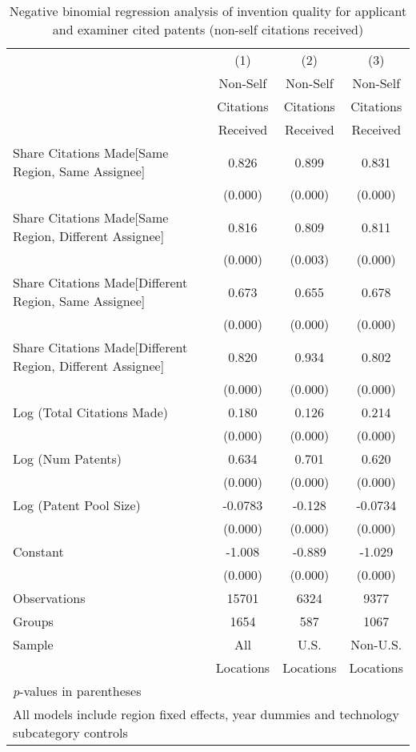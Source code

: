 {
\begin{longtable}{l*{3}{c}}
\caption{Negative binomial regression analysis of invention quality for applicant and examiner cited patents (non-self citations received) \label{ae.model192021}}\\
\hline\hline\endfirsthead\hline\endhead\hline\endfoot\endlastfoot
                &\multicolumn{1}{c}{(1)}&\multicolumn{1}{c}{(2)}&\multicolumn{1}{c}{(3)}\\
                &\multicolumn{1}{c}{Non-Self}&\multicolumn{1}{c}{Non-Self}&\multicolumn{1}{c}{Non-Self}\\
                &\multicolumn{1}{c}{Citations}&\multicolumn{1}{c}{Citations}&\multicolumn{1}{c}{Citations}\\
                &\multicolumn{1}{c}{Received}&\multicolumn{1}{c}{Received}&\multicolumn{1}{c}{Received}\\
\hline
Share Citations Made[Same Region, Same Assignee]&    0.826&    0.899&    0.831\\
                &  (0.000)&  (0.000)&  (0.000)\\
Share Citations Made[Same Region, Different Assignee]&    0.816&    0.809&    0.811\\
                &  (0.000)&  (0.003)&  (0.000)\\
Share Citations Made[Different Region, Same Assignee]&    0.673&    0.655&    0.678\\
                &  (0.000)&  (0.000)&  (0.000)\\
Share Citations Made[Different Region, Different Assignee]&    0.820&    0.934&    0.802\\
                &  (0.000)&  (0.000)&  (0.000)\\
Log (Total Citations Made)&    0.180&    0.126&    0.214\\
                &  (0.000)&  (0.000)&  (0.000)\\
Log (Num Patents)&    0.634&    0.701&    0.620\\
                &  (0.000)&  (0.000)&  (0.000)\\
Log (Patent Pool Size)&  -0.0783&   -0.128&  -0.0734\\
                &  (0.000)&  (0.000)&  (0.000)\\
Constant        &   -1.008&   -0.889&   -1.029\\
                &  (0.000)&  (0.000)&  (0.000)\\
\hline
Observations    &    15701&     6324&     9377\\
Groups          &     1654&      587&     1067\\
Sample&All &U.S. &Non-U.S. \\
          &Locations &Locations&Locations \\
\hline\hline
\multicolumn{4}{l}{\footnotesize \textit{p}-values in parentheses}\\
\multicolumn{4}{l}{\footnotesize All models include region fixed effects, year dummies and technology subcategory controls}\\
\end{longtable}
}
